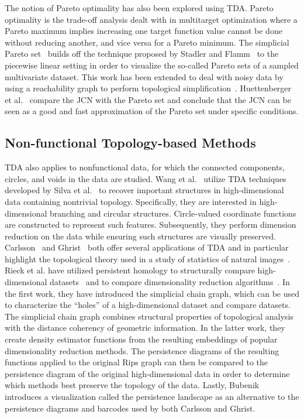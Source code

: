 The notion of Pareto optimality has also been explored using TDA.
%
Pareto optimality is the trade-off analysis dealt with in multitarget optimization where a Pareto maximum implies increasing one target function value cannot be done without reducing another, and vice versa for a Pareto minimum.
%
The simplicial Pareto set~\cite{HuettenbergerHeineCarr2013} builds off the technique proposed by Stadler and Flamm~\cite{StadlerFlamm2003} to the piecewise linear setting in order to visualize the so-called Pareto sets of a sampled multivariate dataset.
%
This work has been extended to deal with noisy data by using a reachability graph to perform topological simplification~\cite{HuettenbergerHeineGarth2014}.
%
Huettenberger et al.~\cite{HuettenbergerHeineGarth2015} compare the JCN with the Pareto set and conclude that the JCN can be seen as a good and fast approximation of the Pareto set under specific conditions.

\subsection{Non-functional Topology-based Methods}
TDA also applies to nonfunctional data, for which the connected components, circles, and voids in the data are studied.
%
Wang et al.~\cite{WangSummaPascucci2011} utilize TDA techniques developed by Silva et al.~\cite{SilvaMorozovVejdemo-Johansson2009} to recover important structures in high-dimensional data containing nontrivial topology.
%
Specifically, they are interested in high-dimensional branching and circular structures.
%
Circle-valued coordinate functions are constructed to represent such features.
%
Subsequently, they perform dimension reduction on the data while ensuring such structures are visually preserved.
%
Carlsson~\cite{Carlsson2009} and Ghrist~\cite{Ghrist2009} both offer several applications of TDA and in particular highlight the topological theory used in a study of statistics of natural images~\cite{LeePedersenMumford2003}.
%
Rieck et al. have utilized persistent homology to structurally compare high-dimensional datasets~\cite{RieckMaraLeitte2012,RieckLeitte2014} and to compare dimensionality reduction algorithms~\cite{RieckLeitte2015}.
%
In the first work, they have introduced the simplicial chain graph, which can be used to characterize the ``holes'' of a high-dimensional dataset and compare datasets.
%
The simplicial chain graph combines structural properties of topological analysis with the distance coherency of geometric information.
%
In the latter work, they create density estimator functions from the resulting embeddings of popular dimensionality reduction methods.
%
The persistence diagrams of the resulting functions applied to the original Rips graph can then be compared to the persistence diagram of the original high-dimensional data in order to determine which methods best preserve the topology of the data.
%
Lastly, Bubenik~\cite{Bubenik2015} introduces a visualization called the persistence landscape as an alternative to the persistence diagrams and barcodes used by both Carlsson and Ghrist.

% 